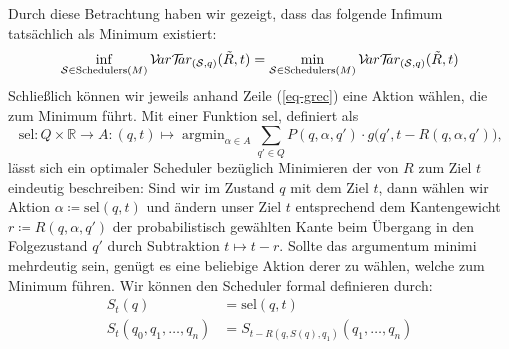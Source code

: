 \documentclass[a4paper]{article}
\DeclareMathOperator*{\argmin}{\arg\min}
\theoremstyle{nonumberplain}
\begin{document}
	\medskip
	Durch diese Betrachtung haben wir gezeigt, dass das folgende Infimum tatsächlich als Minimum existiert:
	\begin{equation}
	\inf_{\mathcal{S} \in \mathrm{Schedulers}(M)}\mathcal{V}\!ar \mathcal{T}\!\!ar_{(\mathcal{S},q)}(\tilde{R},t) = \min_{\mathcal{S} \in \mathrm{Schedulers}(M)}\mathcal{V}\!ar \mathcal{T}\!\!ar_{(\mathcal{S},q)}(\tilde{R},t)
	\end{equation}
	\newcommand{\msel}{\mathrm{sel}}
	Schließlich können wir jeweils anhand Zeile (\ref{eq-grec}) eine Aktion wählen, die zum Minimum führt. Mit einer Funktion $\msel$, definiert als
	\begin{equation}
	\msel : Q \times \mathbb{R} \to A : (q,t) \mapsto \argmin_{\alpha \in A}{\sum_{q' \in Q} P(q,\alpha,q') \cdot g\big(q',t -R(q,\alpha,q')\big)}\text{,}
	\end{equation}
	lässt sich ein optimaler Scheduler bezüglich Minimieren der \vt{} von $R$ zum Ziel $t$ eindeutig beschreiben: Sind wir im Zustand $q$ mit dem Ziel $t$, dann wählen wir Aktion $\alpha \coloneqq \msel(q,t)$ und ändern unser Ziel $t$ entsprechend dem Kantengewicht $r \coloneqq R(q,\alpha,q')$ der probabilistisch gewählten Kante beim Übergang in den Folgezustand $q'$ durch Subtraktion $t \mapsto t - r$. Sollte das argumentum minimi mehrdeutig sein, genügt es eine beliebige Aktion derer zu wählen, welche zum Minimum führen.
	Wir können den Scheduler formal definieren durch:
	\begin{align}
	S_t(q) &= \msel(q,t)\\
	S_t(q_0, q_1,\dots,q_n) &= S_{t-R(q,S(q),q_1)}(q_1,\dots,q_n)
	\end{align}
	
\end{document}
